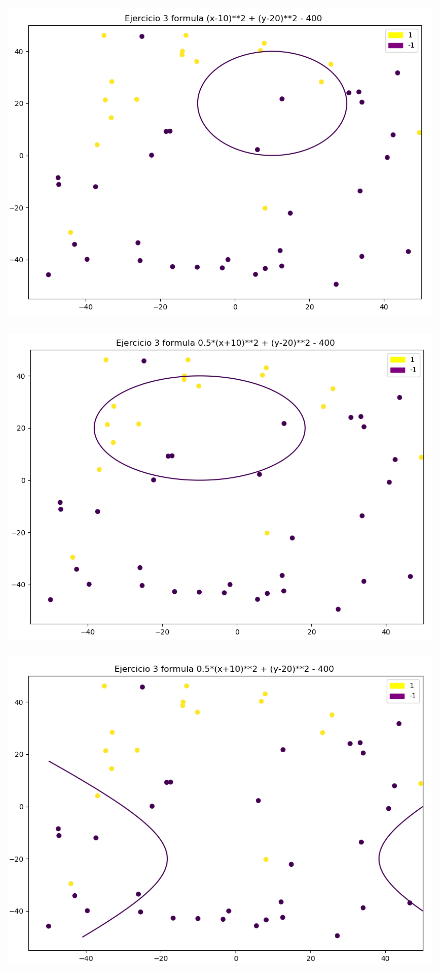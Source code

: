 \documentclass[titlepage]{article}
\begin{document}
	\begin{figure}[H]
		\centering
		\includegraphics[width=0.7\linewidth]{screenshot005}
		\caption{}
		\label{fig:screenshot005}
	\end{figure}
	\begin{figure}[H]
		\centering
		\includegraphics[width=0.7\linewidth]{screenshot007}
		\caption{}
		\label{fig:screenshot007}
	\end{figure}
	\begin{figure}[H]
		\centering
		\includegraphics[width=0.7\linewidth]{screenshot008}
		\caption{}
		\label{fig:screenshot008}
	\end{figure}
\end{document}
